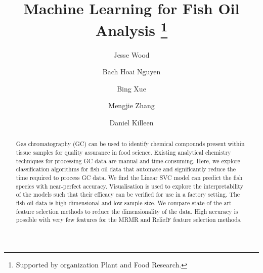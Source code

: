 \documentclass[runningheads]{llncs}
\begin{document}
%
\title{Machine Learning for Fish Oil Analysis \thanks{Supported by organization Plant and Food Research.}}
%
%
\author{Jesse Wood \and
  Bach Hoai Nguyen \and
  Bing Xue \and 
  Mengjie Zhang \and 
  Daniel Killeen
}
%
%

%
\maketitle              %
%
\begin{abstract}
  
  Gas chromatography (GC) can be used to identify chemical compounds present within tissue samples for quality assurance in food science.
  Existing analytical chemistry techniques for processing GC data are manual and time-consuming.
  Here, we explore classification algorithms for fish oil data that automate and significantly reduce the time required to process GC data.
  We find the Linear SVC model can predict the fish species with near-perfect accuracy.
  Visualisation is used to explore the interpretability of the models such that their efficacy can be verified for use in a factory setting.
  The fish oil data is high-dimensional and low sample size.
  We compare state-of-the-art feature selection methods to reduce the dimensionality of the data.
  High accuracy is possible with very few features for the MRMR and ReliefF feature selection methods.
  
\end{abstract}
\end{document}
